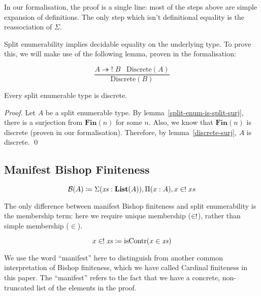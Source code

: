 In our formalisation, the proof is a single line: most of the steps above are
simple expansion of definitions.
The only step which isn't definitional equality is the reassociation of
\(\Sigma\).

Split enumerability implies decidable equality on the underlying type.
To prove this, we will make use of the following lemma, proven in the
formalisation:
\begin{romlemma} \label{discrete-surj}
  \begin{equation}
    \frac{
        A \twoheadrightarrow! \; B \; \; \; \text{Discrete}(A)
      }{
       \text{Discrete}(B) 
      }
  \end{equation}
\end{romlemma}
\begin{romlemma} \label{split-enum-discrete}
  Every split enumerable type is discrete.
\end{romlemma}
\begin{proof}
  Let \(A\) be a split enumerable type.
  By lemma~\ref{split-enum-is-split-surj}, there is a surjection from
  \(\mathbf{Fin}(n)\) for some \(n\).
  Also, we know that \(\mathbf{Fin}(n)\) is discrete (proven in our
  formalisation).
  Therefore, by lemma~\ref{discrete-surj}, \(A\) is discrete.
  \qed
\end{proof}
\subsection{Manifest Bishop Finiteness}
\begin{romdefinition}
  \begin{equation} \label{bish-def}
    \mathcal{B}(A) \coloneqq \Sigma {(\mathit{xs} : \textbf{List}(A))} , \Pi {(x : A)} , x \inunique xs
  \end{equation}
\end{romdefinition}
The only difference between manifest Bishop finiteness and split enumerability
is the membership term: here we require unique membership (\(\inunique\)),
rather than simple membership (\(\in\)).
\begin{romdefinition} \label{uniq-memb-def}
  \begin{equation}
    x \inunique \mathit{xs} \coloneqq \text{isContr}(x \in \mathit{xs})
  \end{equation}
\end{romdefinition}

We use the word ``manifest'' here to distinguish from another common
interpretation of Bishop finiteness, which we have called Cardinal finiteness in
this paper.
The ``manifest'' refers to the fact that we have a concrete, non-truncated list
of the elements in the proof.

